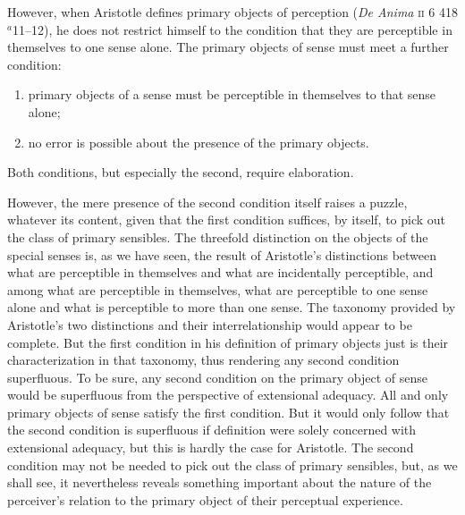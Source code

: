 However, when Aristotle defines primary objects of perception (\emph{De Anima} \textsc{ii} 6 418\( ^{a} \)11--12), he does not restrict himself to the condition that they are perceptible in themselves to one sense alone. The primary objects of sense must meet a further condition: 
\begin{enumerate}[(1)]
	\item primary objects of a sense must be perceptible in themselves to that sense alone;
	\item no error is possible about the presence of the primary objects.
\end{enumerate}
Both conditions, but especially the second, require elaboration. 

However, the mere presence of the second condition itself raises a puzzle, whatever its content, given that the first condition suffices, by itself, to pick out the class of primary sensibles. The threefold distinction on the objects of the special senses is, as we have seen, the result of Aristotle's distinctions between what are perceptible in themselves and what are incidentally perceptible, and among what are perceptible in themselves, what are perceptible to one sense alone and what is perceptible to more than one sense. The taxonomy provided by Aristotle's two distinctions and their interrelationship would appear to be complete. But the first condition in his definition of primary objects just is their characterization in that taxonomy, thus rendering any second condition superfluous. To be sure, any second condition on the primary object of sense would be superfluous from the perspective of extensional adequacy. All and only primary objects of sense satisfy the first condition. But it would only follow that the second condition is superfluous if definition were solely concerned with extensional adequacy, but this is hardly the case for Aristotle. The second condition may not be needed to pick out the class of primary sensibles, but, as we shall see, it nevertheless reveals something important about the nature of the perceiver's relation to the primary object of their perceptual experience.
% 
